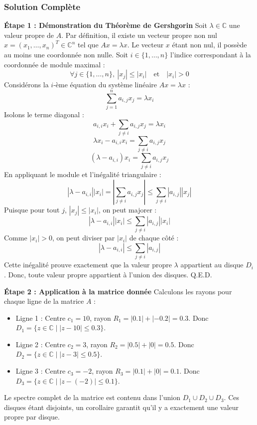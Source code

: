 \documentclass[11pt,a4paper]{article}
\begin{document}
\subsubsection*{Solution Complète}

\textbf{Étape 1 : Démonstration du Théorème de Gershgorin}
Soit $\lambda \in \mathbb{C}$ une valeur propre de $A$. Par définition, il existe un vecteur propre non nul $x = (x_1, \dots, x_n)^T \in \mathbb{C}^n$ tel que $Ax = \lambda x$.
Le vecteur $x$ étant non nul, il possède au moins une coordonnée non nulle. Soit $i \in \{1, \dots, n\}$ l'indice correspondant à la coordonnée de module maximal :
$$\forall j \in \{1, \dots, n\}, \ |x_j| \leq |x_i| \quad \text{et} \quad |x_i| > 0$$
Considérons la $i$-ème équation du système linéaire $Ax = \lambda x$ :
$$\sum_{j=1}^n a_{i,j} x_j = \lambda x_i$$
Isolons le terme diagonal :
$$a_{i,i} x_i + \sum_{j \neq i} a_{i,j} x_j = \lambda x_i$$
$$\lambda x_i - a_{i,i} x_i = \sum_{j \neq i} a_{i,j} x_j$$
$$(\lambda - a_{i,i}) x_i = \sum_{j \neq i} a_{i,j} x_j$$
En appliquant le module et l'inégalité triangulaire :
$$|\lambda - a_{i,i}| |x_i| = \left| \sum_{j \neq i} a_{i,j} x_j \right| \leq \sum_{j \neq i} |a_{i,j}| |x_j|$$
Puisque pour tout $j$, $|x_j| \leq |x_i|$, on peut majorer :
$$|\lambda - a_{i,i}| |x_i| \leq \sum_{j \neq i} |a_{i,j}| |x_i|$$
Comme $|x_i| > 0$, on peut diviser par $|x_i|$ de chaque côté :
$$|\lambda - a_{i,i}| \leq \sum_{j \neq i} |a_{i,j}|$$
Cette inégalité prouve exactement que la valeur propre $\lambda$ appartient au disque $D_i$.
Donc, toute valeur propre appartient à l'union des disques. Q.E.D.

\textbf{Étape 2 : Application à la matrice donnée}
Calculons les rayons pour chaque ligne de la matrice $A$ :
\begin{itemize}
\item Ligne 1 : Centre $c_1 = 10$, rayon $R_1 = |0.1| + |-0.2| = 0.3$. Donc $D_1 = \{ z \in \mathbb{C} \mid |z - 10| \leq 0.3 \}$.
\item Ligne 2 : Centre $c_2 = 3$, rayon $R_2 = |0.5| + |0| = 0.5$. Donc $D_2 = \{ z \in \mathbb{C} \mid |z - 3| \leq 0.5 \}$.
\item Ligne 3 : Centre $c_3 = -2$, rayon $R_3 = |0.1| + |0| = 0.1$. Donc $D_3 = \{ z \in \mathbb{C} \mid |z - (-2)| \leq 0.1 \}$.
\end{itemize}
Le spectre complet de la matrice est contenu dans l'union $D_1 \cup D_2 \cup D_3$.
Ces disques étant disjoints, un corollaire garantit qu'il y a exactement une valeur propre par disque.
\end{document}
